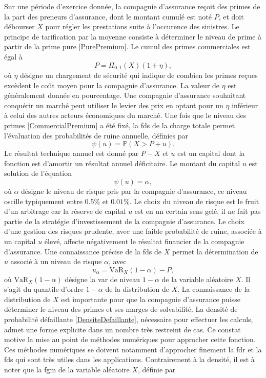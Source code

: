 Sur une période d\rq{}exercice donnée, la compagnie d\rq{}assurance reçoit des primes de la part des preneurs d\rq{}assurance, dont le montant cumulé est noté $P$, et doit débourser $X$ pour régler les prestations suite à l\rq{}occurence des sinistres. Le principe de tarification par la moyenne consiste à déterminer le niveau de prime à partir de la prime pure \eqref{PurePremium}. Le cumul des primes commerciales est égal à 
\begin{equation}\label{CommercialPremium}
P=\Pi_{0,1}(X)(1+\eta),
\end{equation}
où $\eta$ désigne un chargement de sécurité qui indique de combien les primes reçues excèdent le coût moyen pour la compagnie d\rq{}assurance. La valeur de $\eta$ est généralement donnée en pourcentage. Une compagnie d\rq{}assurance souhaitant conquérir un marché peut utiliser le levier des prix en optant pour un $\eta$ inférieur à celui des autres acteurs économiques du marché. Une fois que le niveau des primes \eqref{CommercialPremium} a été fixé, la \gls{fds} de la charge totale permet l\rq{}évaluation des probabilités de ruine annuelle, définies par 
\begin{equation}\label{AnnualRuinProbability}
\psi(u)=\mathbb{P}(X>P+u).
\end{equation}
Le résultat technique annuel est donné par $P-X$ et $u$ est un capital dont la fonction est d\rq{}amortir un résultat annuel déficitaire. Le montant du capital $u$ est solution de l\rq{}équation 
\begin{equation*}\label{EquationSolvencyCapital1}
\psi(u)=\alpha,
\end{equation*}
où $\alpha$ désigne le niveau de risque pris par la compagnie d\rq{}assurance, ce niveau oscille typiquement entre $0.5\%$ et $0.01\%$. Le choix du niveau de risque est le fruit d\rq{}un arbitrage car la réserve de capital $u$ est en un certain sens gelé, il ne fait pas partie de la stratégie d\rq{}investissement de la compagnie d\rq{}assurance. Le choix d\rq{}une gestion des risques prudente, avec une faible probabilité de ruine, associée à un capital $u$ élevé, affecte négativement le résultat financier de la compagnie d\rq{}assurance. Une connaissance précise de la \gls{fds} de $X$ permet la détermination  de $u$ associé à un niveau de risque $\alpha$, avec
\begin{equation*}
u_{\alpha}= \text{VaR}_{X}(1-\alpha)-P,
\end{equation*}
où $\text{VaR}_{X}(1-\alpha)$ désigne la \gls{var} de niveau $1-\alpha$ de la variable aléatoire $X$. Il s\rq{}agit du quantile d\rq{}ordre $1-\alpha$ de la distribution de $X$. La connaissance de la distribution de $X$ est importante pour que la compagnie d\rq{}assurance puisse déterminer le niveau des primes et ses marges de solvabilité. La densité de probabilité défaillante \eqref{DensiteDefaillante}, nécessaire pour effectuer les calculs, admet une forme explicite dans un nombre très restreint de cas. Ce constat motive la mise au point de méthodes numériques pour approcher cette fonction. Ces méthodes numériques se doivent notamment d\rq{}approcher finement la \gls{fdr} et la \gls{fds} qui sont très utiles dans les applications. Contrairement à la densité, il est à noter que la \gls{fgm} de la variable aléatoire $X$, définie par  
